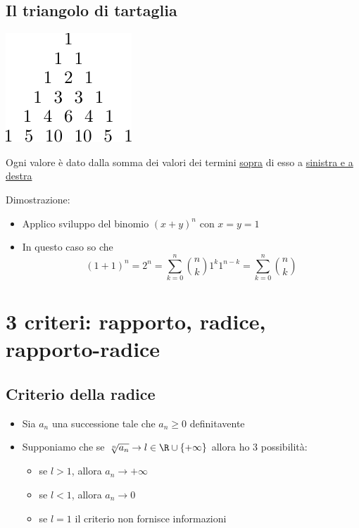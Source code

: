 \subsection{Il triangolo di tartaglia}
	\begin{center}
		\includegraphics{Images/Tartaglia.pdf}
	\end{center}
Ogni valore è dato dalla somma dei valori dei termini \underline{sopra} di esso a \underline{sinistra e a destra}

Dimostrazione:
\begin{itemize}
	\item Applico sviluppo del binomio $\left( x+y \right) ^{n}$ con $x=y=1$
	\item In questo caso so che \[
	\left( 1+1 \right) ^{n} = 2^{n}= \sum_{k=0}^{n} \binom{n}{k}1^{k}1^{n-k}= \sum_{k=0}^{n} \binom{n}{k}
	\] 
\end{itemize}
\section{3 criteri: rapporto, radice, rapporto-radice}
\subsection{Criterio della radice}
\begin{itemize}
	\item Sia $a_n$ una successione tale che $a_n \ge 0 $ definitavente
	\item Supponiamo che se $\sqrt[n]{a_n} \to l \in  \R \cup \left\{ +\infty \right\} $ allora ho 3 possibilità:
	\begin{itemize}
		\item se $l > 1$, allora $ a_n \to +\infty$
		\item se $l < 1$, allora $a_n \to 0$
		\item se  $l=1$ il criterio non fornisce informazioni 
	\end{itemize}
\end{itemize}
